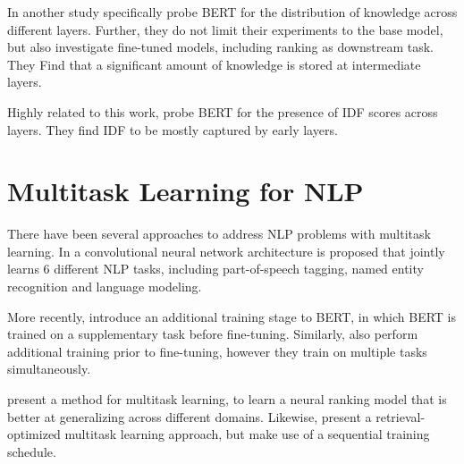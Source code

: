 In another study \citep{singh-etal-2020-bertnesia} specifically probe BERT for the distribution of knowledge across different layers. Further, they do not limit their experiments to the base model, but also investigate fine-tuned models, including ranking as downstream task. They Find that a significant amount of knowledge is stored at intermediate layers.

Highly related to this work, \citep{https://doi.org/10.48550/arxiv.2202.12191} probe BERT for the presence of IDF scores across layers. They find IDF to be mostly captured by early layers.

\section{Multitask Learning for NLP}
There have been several approaches to address NLP problems with multitask learning. In \citep{10.1145/1390156.1390177} a convolutional neural network architecture is proposed that jointly learns 6 different NLP tasks, including part-of-speech tagging, named entity recognition and language modeling.

More recently, \citep{DBLP:journals/corr/abs-1811-01088} introduce an additional training stage to BERT, in which BERT is trained on a supplementary task before fine-tuning. Similarly, \citep{DBLP:journals/corr/abs-1901-11504} also perform additional training prior to fine-tuning, however they train on multiple tasks simultaneously.

\citep{maillard-etal-2021-multi} present a method for multitask learning, to learn a neural ranking model that is better at generalizing across different domains. Likewise, \citep{Fun2021EfficientRO} present a retrieval-optimized multitask learning approach, but make use of a sequential training schedule.